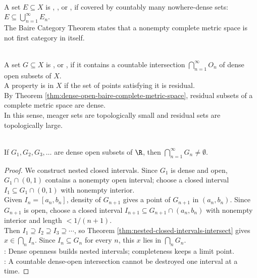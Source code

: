 \begin{definition} \label{def:first-category-set} \\
A set $E\subseteq X$ is , , or , if covered by countably many nowhere-dense sets: $E\subseteq \bigcup\limits_{n=1}^{\infty}E_n$.\\
The Baire Category Theorem states that a nonempty complete metric space is not first category in itself.
\end{definition}

\begin{definition} \label{def:residual-thick-generic-set} \\
A set $G\subseteq X$ is , or , if it contains a countable intersection $\bigcap\limits_{n=1}^{\infty}O_n$ of dense open subsets of $X$.\\
A property is  in $X$ if the set of points satisfying it is residual.\\
By Theorem \ref{thm:dense-open-baire-complete-metric-space}, residual subsets of a complete metric space are dense.\\
In this sense, meager sets are topologically small and residual sets are topologically large.
\end{definition}

\begin{theorem} \label{thm:dense-open-baire-real-line}\label{thm:completeness-and-baire-source-todo} \\
If $G_1,G_2,G_3,\ldots$ are dense open subsets of $\R$, then $\bigcap_{n=1}^{\infty}G_n\neq\emptyset$.
\begin{proof}
We construct nested closed intervals. Since $G_1$ is dense and open, $G_1\cap(0,1)$ contains a nonempty open interval; choose a closed interval $I_1\subseteq G_1\cap(0,1)$ with nonempty interior.\\
Given $I_n=[a_n,b_n]$, density of $G_{n+1}$ gives a point of $G_{n+1}$ in $(a_n,b_n)$. Since $G_{n+1}$ is open, choose a closed interval $I_{n+1}\subseteq G_{n+1}\cap(a_n,b_n)$ with nonempty interior and length $<1/(n+1)$.\\
Then $I_1\supseteq I_2\supseteq I_3\supseteq\cdots$, so Theorem \ref{thm:nested-closed-intervals-intersect} gives $x\in\bigcap_n I_n$. Since $I_n\subseteq G_n$ for every $n$, this $x$ lies in $\bigcap_nG_n$.\\
: Dense openness builds nested intervals; completeness keeps a limit point.\\
: A countable dense-open intersection cannot be destroyed one interval at a time.
\end{proof}
\end{theorem}

